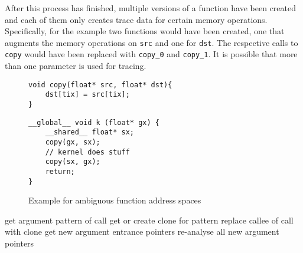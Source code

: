 After this process has finished, multiple versions of a function have been created and each of them only creates trace data for certain memory operations. Specifically, for the example two functions would have been created, one that augments the memory operations on \verb|src| and one for \verb|dst|. The respective calls to \verb|copy| would have been replaced with \verb|copy_0| and \verb|copy_1|. It is possible that more than one parameter is used for tracing.

\begin{figure}[t]
	\begin{minipage}{0.45\textwidth}
		
		\begin{lstlisting}[style=c]
void copy(float* src, float* dst){
	dst[tix] = src[tix];
}\end{lstlisting}
	\end{minipage}\hfill
	\begin{minipage}{0.45\textwidth}
			\begin{lstlisting}[style=c]
__global__ void k (float* gx) {
	__shared__ float* sx;
	copy(gx, sx);
	// kernel does stuff
	copy(sx, gx);
	return;
}\end{lstlisting}
	\end{minipage}\hfill
\begin{minipage}{\textwidth}
	
\end{minipage}\vfill
	\caption{Example for ambiguous function address spaces}
	\label{func-vers}
\end{figure}
\begin{algorithm}[t]
	 {
		get argument pattern of call\;
		get or create clone for pattern\;
		replace callee of call with clone\;
		get new argument entrance pointers\;
	}
	 {
		re-analyse all new argument pointers\;
	}
	\caption{Algorithm for function specialization}
	\label{anal-algo}
\end{algorithm}
